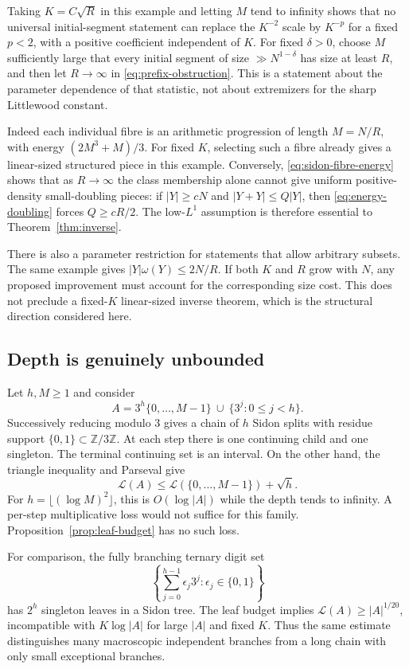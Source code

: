 \documentclass[11pt,reqno]{amsart}
\numberwithin{equation}{section}
\theoremstyle{definition}
\theoremstyle{remark}
\newcommand{\Z}{\mathbb Z}
\newcommand{\La}{\mathcal L}
\begin{document}
Taking $K=C\sqrt R$ in this example and letting $M$ tend to infinity
shows that no universal initial-segment statement can replace the
$K^{-2}$ scale by $K^{-p}$ for a fixed $p<2$, with a positive coefficient
independent of $K$. For fixed $\delta>0$, choose $M$ sufficiently large
that every initial segment of size $\gg N^{1-\delta}$ has size at least
$R$, and then let $R\to\infty$ in \eqref{eq:prefix-obstruction}.
This is a statement about the parameter dependence of that statistic,
not about extremizers for the sharp Littlewood constant.

Indeed each individual fibre is an arithmetic progression of length
$M=N/R$, with energy $(2M^3+M)/3$. For fixed $K$, selecting such a
fibre already gives a linear-sized structured piece in this example.
Conversely, \eqref{eq:sidon-fibre-energy} shows that as $R\to\infty$
the class membership alone cannot give uniform positive-density
small-doubling pieces: if $|Y|\ge cN$ and $|Y+Y|\le Q|Y|$, then
\eqref{eq:energy-doubling} forces $Q\ge cR/2$. The low-$L^1$ assumption
is therefore essential to Theorem~\ref{thm:inverse}.

There is also a parameter restriction for statements that allow
arbitrary subsets. The same example gives
$|Y|\omega(Y)\le2N/R$. If both $K$ and $R$ grow with $N$, any proposed
improvement must account for the corresponding size cost. This does
not preclude a fixed-$K$ linear-sized inverse theorem, which is the
structural direction considered here.

\subsection{Depth is genuinely unbounded}

Let $h,M\ge1$ and consider
\begin{equation}\label{eq:unbalanced-example}
 A=3^h\{0,\ldots,M-1\}\ \cup\ \{3^j:0\le j<h\}.
\end{equation}
Successively reducing modulo $3$ gives a chain of $h$ Sidon splits
with residue support $\{0,1\}\subset\Z/3\Z$. At each step there is
one continuing child and one singleton. The terminal continuing set
is an interval. On the other hand, the triangle inequality and Parseval
give
\[
 \La(A)\le\La(\{0,\ldots,M-1\})+\sqrt h.
\]
For $h=\lfloor(\log M)^2\rfloor$, this is $O(\log|A|)$ while the
depth tends to infinity. A per-step multiplicative loss would not
suffice for this family. Proposition~\ref{prop:leaf-budget} has no such
loss.

For comparison, the fully branching ternary digit set
\[
 \left\{\sum_{j=0}^{h-1}\epsilon_j3^j:\epsilon_j\in\{0,1\}\right\}
\]
has $2^h$ singleton leaves in a Sidon tree. The leaf budget implies
$\La(A)\ge|A|^{1/20}$, incompatible with $K\log|A|$ for large $|A|$
and fixed $K$. Thus the same estimate distinguishes many macroscopic
independent branches from a long chain with only small exceptional
branches.
\end{document}
